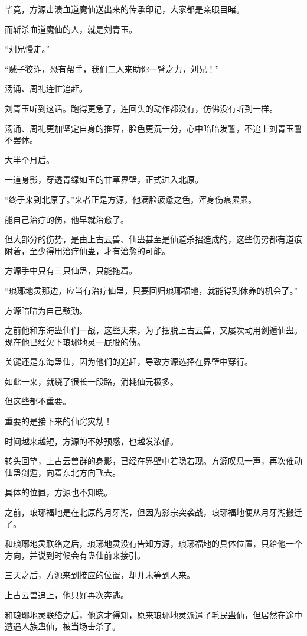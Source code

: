\begin{this_body}
毕竟，方源击溃血道魔仙送出来的传承印记，大家都是亲眼目睹。

而斩杀血道魔仙的人，就是刘青玉。

“刘兄慢走。”

“贼子狡诈，恐有帮手，我们二人来助你一臂之力，刘兄！”

汤诵、周礼连忙追赶。

刘青玉听到这话。跑得更急了，连回头的动作都没有，仿佛没有听到一样。

汤诵、周礼更加坚定自身的推算，脸色更沉一分，心中暗暗发誓，不追上刘青玉誓不罢休。

大半个月后。

一道身影，穿透青绿如玉的甘草界壁，正式进入北原。

“终于来到北原了。”来者正是方源，他满脸疲惫之色，浑身伤痕累累。

能自己治疗的伤，他早就治愈了。

但大部分的伤势，是由上古云兽、仙蛊甚至是仙道杀招造成的，这些伤势都有道痕附着，至少得用治疗仙蛊，才有治愈的可能。

方源手中只有三只仙蛊，只能拖着。

“琅琊地灵那边，应当有治疗仙蛊，只要回归琅琊福地，就能得到休养的机会了。”

方源暗暗为自己鼓劲。

之前他和东海蛊仙们一战，这些天来，为了摆脱上古云兽，又屡次动用剑遁仙蛊。现在他已经欠下琅琊地灵一屁股的债。

关键还是东海蛊仙，因为他们的追赶，导致方源选择在界壁中穿行。

如此一来，就绕了很长一段路，消耗仙元极多。

但这些都不重要。

重要的是接下来的仙窍灾劫！

时间越来越短，方源的不妙预感，也越发浓郁。

转头回望，上古云兽群的身影，已经在界壁中若隐若现。方源叹息一声，再次催动仙蛊剑遁，向着东北方向飞去。

具体的位置，方源也不知晓。

之前，琅琊福地是在北原的月牙湖，但因为影宗突袭战，琅琊福地便从月牙湖搬迁了。

和琅琊地灵联络之后，琅琊地灵没有告知方源，琅琊福地的具体位置，只给他一个方向，并说到时候会有蛊仙前来接引。

三天之后，方源来到接应的位置，却并未等到人来。

上古云兽追上，他只好再次奔逃。

和琅琊地灵联络之后，他这才得知，原来琅琊地灵派遣了毛民蛊仙，但居然在途中遭遇人族蛊仙，被当场击杀了。


\end{this_body}
